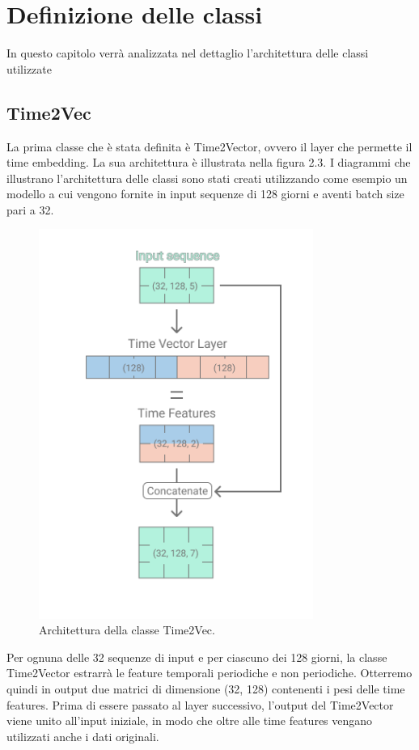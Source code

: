 \documentclass[12pt,a4paper,twoside,openright]{book}
\begin{document}
\section{Definizione delle classi}
In questo capitolo verrà analizzata nel dettaglio l'architettura delle classi utilizzate
\subsection{Time2Vec}
La prima classe che è stata definita è Time2Vector, ovvero il layer che permette il time embedding. La sua architettura è illustrata nella figura 2.3. I diagrammi che illustrano l'architettura delle classi sono stati creati utilizzando come esempio un modello a cui vengono fornite in input sequenze di 128 giorni e aventi batch size pari a 32.

\begin{figure}[H]
\centering
\includegraphics[width=0.8\textwidth]{images/time2vector.png}
\caption{Architettura della classe Time2Vec.}
\label{fig:rapp_file}
\end{figure}

Per ognuna delle 32 sequenze di input e per ciascuno dei 128 giorni, la classe Time2Vector estrarrà le feature temporali periodiche e non periodiche. Otterremo quindi in output due matrici di dimensione (32, 128) contenenti i pesi delle time features.
Prima di essere passato al layer successivo, l’output del Time2Vector viene unito all’input iniziale, in modo che oltre alle time features vengano utilizzati anche i dati originali.
\end{document}

